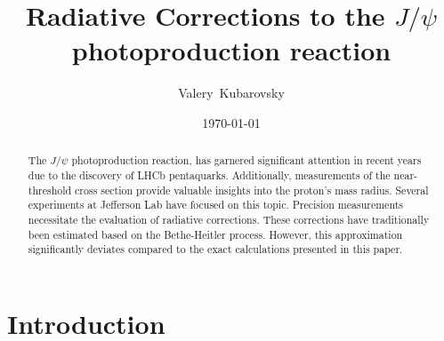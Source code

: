 \documentclass[prd,onecolumn,showpcs,amsmath,amssymb,nofootinbib,notitlepage,preprintnumbers,balancelastpage,longbibliography]{revtex4-2}
\begin{document}
\title{Radiative Corrections to the $J/\psi$ photoproduction reaction}
 \date{\today}
\author{Valery~Kubarovsky}

\begin{abstract}
The $J/\psi$ photoproduction reaction, has garnered significant attention in recent years due to the discovery of LHCb pentaquarks. Additionally, measurements of the near-threshold cross section provide valuable insights into the proton's mass radius. Several experiments at Jefferson Lab have focused on this topic. Precision measurements necessitate the evaluation of radiative corrections. These corrections have traditionally been estimated based on the Bethe-Heitler process. However, this approximation significantly deviates compared to the exact calculations presented in this paper.

\end{abstract}

\maketitle


\section{Introduction}
\label{sec:intro}
\end{document}
